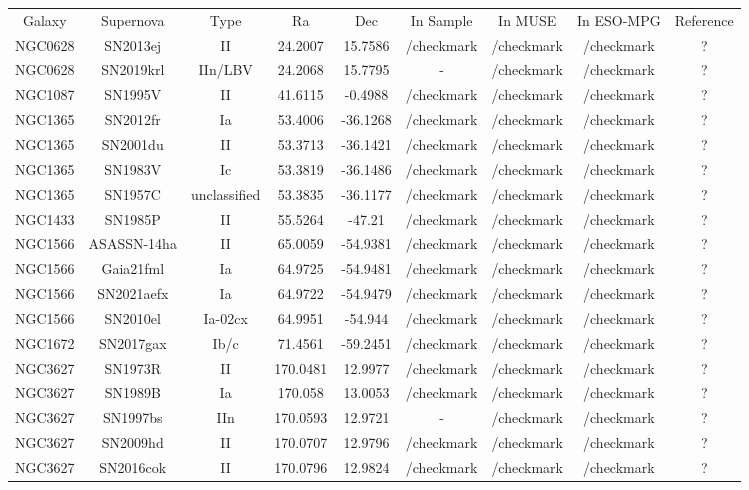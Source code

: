 \begin{table}
\begin{tabular}{ccccccccc}
Galaxy & Supernova & Type & Ra & Dec & In Sample & In MUSE & In ESO-MPG & Reference \\
NGC0628 & SN2013ej & II & 24.2007 & 15.7586 & /checkmark & /checkmark & /checkmark & ? \\
NGC0628 & SN2019krl & IIn/LBV & 24.2068 & 15.7795 & - & /checkmark & /checkmark & ? \\
NGC1087 & SN1995V & II & 41.6115 & -0.4988 & /checkmark & /checkmark & /checkmark & ? \\
NGC1365 & SN2012fr & Ia & 53.4006 & -36.1268 & /checkmark & /checkmark & /checkmark & ? \\
NGC1365 & SN2001du & II & 53.3713 & -36.1421 & /checkmark & /checkmark & /checkmark & ? \\
NGC1365 & SN1983V & Ic & 53.3819 & -36.1486 & /checkmark & /checkmark & /checkmark & ? \\
NGC1365 & SN1957C & unclassified & 53.3835 & -36.1177 & /checkmark & /checkmark & /checkmark & ? \\
NGC1433 & SN1985P & II & 55.5264 & -47.21 & /checkmark & /checkmark & /checkmark & ? \\
NGC1566 & ASASSN-14ha & II & 65.0059 & -54.9381 & /checkmark & /checkmark & /checkmark & ? \\
NGC1566 & Gaia21fml & Ia & 64.9725 & -54.9481 & /checkmark & /checkmark & /checkmark & ? \\
NGC1566 & SN2021aefx & Ia & 64.9722 & -54.9479 & /checkmark & /checkmark & /checkmark & ? \\
NGC1566 & SN2010el & Ia-02cx & 64.9951 & -54.944 & /checkmark & /checkmark & /checkmark & ? \\
NGC1672 & SN2017gax & Ib/c & 71.4561 & -59.2451 & /checkmark & /checkmark & /checkmark & ? \\
NGC3627 & SN1973R & II & 170.0481 & 12.9977 & /checkmark & /checkmark & /checkmark & ? \\
NGC3627 & SN1989B & Ia & 170.058 & 13.0053 & /checkmark & /checkmark & /checkmark & ? \\
NGC3627 & SN1997bs & IIn & 170.0593 & 12.9721 & - & /checkmark & /checkmark & ? \\
NGC3627 & SN2009hd & II & 170.0707 & 12.9796 & /checkmark & /checkmark & /checkmark & ? \\
NGC3627 & SN2016cok & II & 170.0796 & 12.9824 & /checkmark & /checkmark & /checkmark & ? \\

\end{tabular}
\end{table}
